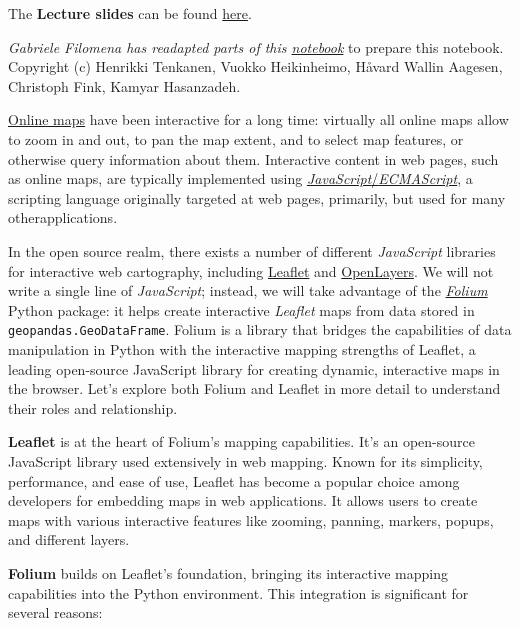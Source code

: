 \documentclass[
  letterpaper,
  DIV=11,
  numbers=noendperiod]{scrreprt}
\begin{document}
The \textbf{Lecture slides} can be found
\href{https://github.com/GDSL-UL/wma/raw/main/lectures/w05.html}{here}.

\emph{Gabriele Filomena has readapted parts of this
\href{https://autogis-site.readthedocs.io/en/latest/lessons/lesson-5/interactive-maps.html}{notebook}}
to prepare this notebook. Copyright (c) Henrikki Tenkanen, Vuokko
Heikinheimo, Håvard Wallin Aagesen, Christoph Fink, Kamyar Hasanzadeh.

\href{https://link.springer.com/referenceworkentry/10.1007/978-3-319-23519-6_1485-2}{Online
maps} have been interactive for a long time: virtually all online maps
allow to zoom in and out, to pan the map extent, and to select map
features, or otherwise query information about them. Interactive content
in web pages, such as online maps, are typically implemented using
\href{https://en.wikipedia.org/wiki/ECMAScript}{\emph{JavaScript}/\emph{ECMAScript}},
a scripting language originally targeted at web pages, primarily, but
used for many otherapplications.

In the open source realm, there exists a number of different
\emph{JavaScript} libraries for interactive web cartography, including
\href{https://leafletjs.com/}{Leaflet} and
\href{https://openlayers.org/}{OpenLayers}. We will not write a single
line of \emph{JavaScript}; instead, we will take advantage of the
\href{https://python-visualization.github.io/folium/}{\emph{Folium}}
Python package: it helps create interactive \emph{Leaflet} maps from
data stored in \texttt{geopandas.GeoDataFrame}. Folium is a library that
bridges the capabilities of data manipulation in Python with the
interactive mapping strengths of Leaflet, a leading open-source
JavaScript library for creating dynamic, interactive maps in the
browser. Let's explore both Folium and Leaflet in more detail to
understand their roles and relationship.

\textbf{Leaflet} is at the heart of Folium's mapping capabilities. It's
an open-source JavaScript library used extensively in web mapping. Known
for its simplicity, performance, and ease of use, Leaflet has become a
popular choice among developers for embedding maps in web applications.
It allows users to create maps with various interactive features like
zooming, panning, markers, popups, and different layers.

\textbf{Folium} builds on Leaflet's foundation, bringing its interactive
mapping capabilities into the Python environment. This integration is
significant for several reasons:
\end{document}
